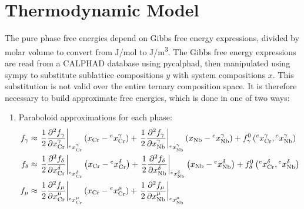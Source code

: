 \documentclass[10pt]{article}
\begin{document}
	\section{Thermodynamic Model}
		The pure phase free energies depend on Gibbs free energy expressions, divided by molar volume to convert from \si{\joule/\mole} to \si{\joule/\cubic\meter}.
		The Gibbs free energy expressions are read from a CALPHAD database using pycalphad,
		then manipulated using sympy to substitute sublattice compositions $y$ with system compositions $x$.
		This substitution is not valid over the entire ternary composition space.
		It is therefore necessary to build approximate free energies, which is done in one of two ways:
		\begin{enumerate}
			\item Paraboloid approximations for each phase: %
			      \begin{align}
			      f_{\gamma} &\approx \left.\frac{1}{2}\frac{\partial^2 f_{\gamma}}{\partial x_{\ce{Cr}}^{\gamma}}\right|_{\prescript{e}{}{x}_{\ce{Cr}}^{\gamma}}
			                          \left(x_{\ce{Cr}} - \prescript{e}{}{x}_{\ce{Cr}}^{\gamma}\right)
			                        + \left.\frac{1}{2}\frac{\partial^2 f_{\gamma}}{\partial x_{\ce{Nb}}^{\gamma}}\right|_{\prescript{e}{}{x}_{\ce{Nb}}^{\gamma}}
			                          \left(x_{\ce{Nb}} - \prescript{e}{}{x}_{\ce{Nb}}^{\gamma}\right)
			                        + f^0_{\gamma}\left(\prescript{e}{}{x}_{\ce{Cr}}^{\gamma}, \prescript{e}{}{x}_{\ce{Nb}}^{\gamma}\right)\\ 
			      f_{\delta} &\approx \left.\frac{1}{2}\frac{\partial^2 f_{\delta}}{\partial x_{\ce{Cr}}^{\delta}}\right|_{\prescript{e}{}{x}_{\ce{Cr}}^{\delta}}
			                          \left(x_{\ce{Cr}} - \prescript{e}{}{x}_{\ce{Cr}}^{\delta}\right)
			                        + \left.\frac{1}{2}\frac{\partial^2 f_{\delta}}{\partial x_{\ce{Nb}}^{\delta}}\right|_{\prescript{e}{}{x}_{\ce{Nb}}^{\delta}}
			                          \left(x_{\ce{Nb}} - \prescript{e}{}{x}_{\ce{Nb}}^{\delta}\right)
			                        + f^0_{\delta}\left(\prescript{e}{}{x}_{\ce{Cr}}^{\delta}, \prescript{e}{}{x}_{\ce{Nb}}^{\delta}\right)\\ 
			      f_{\mu} &\approx    \left.\frac{1}{2}\frac{\partial^2 f_{\mu}}{\partial x_{\ce{Cr}}^{\mu}}\right|_{\prescript{e}{}{x}_{\ce{Cr}}^{\mu}}
			                          \left(x_{\ce{Cr}} - \prescript{e}{}{x}_{\ce{Cr}}^{\mu}\right)
			                        + \left.\frac{1}{2}\frac{\partial^2 f_{\mu}}{\partial x_{\ce{Nb}}^{\mu}}\right|_{\prescript{e}{}{x}_{\ce{Nb}}^{\mu}}

\end{align}
\end{enumerate}
\end{document}
